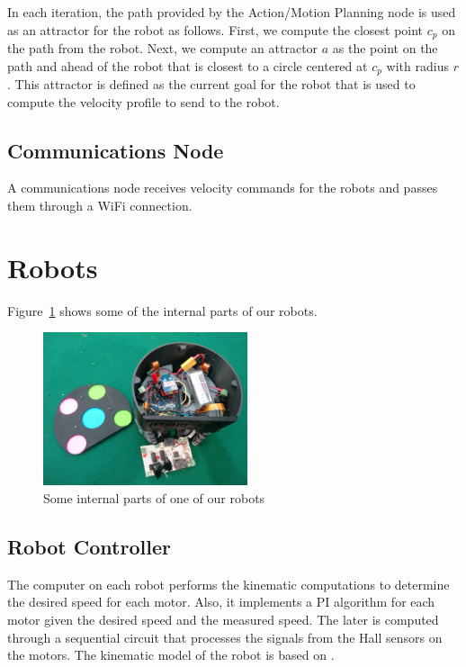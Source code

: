 \documentclass[]{llncs}
\newcommand{\TODO}[1]{{\textcolor{blue}{ToDo: {#1}}}}
\begin{document}
In each iteration, the path provided by the Action/Motion Planning node is used as an attractor for the robot as follows. First, we compute the closest point $c_p$ on the path from the robot. Next, we compute an attractor $a$ as the point on the path and ahead of the robot that is closest to a circle centered at $c_p$ with radius $r$. This attractor is defined as the current goal for the robot that is used to compute the velocity profile to send to the robot.


\subsection{Communications Node}
A communications node receives velocity commands for the robots and passes them through a WiFi connection.




\section{Robots}

Figure~\ref{fig:one_ekbot_inside} shows some of the internal parts of our robots.

\begin{figure}[htb]
	\centering
	\includegraphics[width=6cm]{./pictures/one_ekbot_inside.jpg}
	\caption{Some internal parts of one of our robots}
	\label{fig:one_ekbot_inside}  
\end{figure}


\subsection{Robot Controller}
The computer on each robot performs the kinematic computations to
determine the desired speed for each motor. Also, it implements a PI
algorithm for each motor given the desired speed and the measured
speed. The later is computed through a sequential circuit that processes
the signals from the Hall sensors on the motors. The kinematic model of the robot is based on \cite{rojas05}. 
\end{document}
